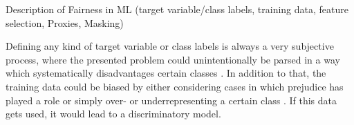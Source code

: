 Description of Fairness in ML (target variable/class labels, training data, feature selection, 
Proxies, Masking)

Defining any kind of target variable or class labels is always a very subjective process, where 
the presented problem could unintentionally be parsed in a way which systematically disadvantages 
certain classes \cite{Barocas.2016}. In addition to that, the training data could be biased by 
either considering cases in which prejudice has played a role or simply over- or underrepresenting 
a certain class \cite{Barocas.2016}. If this data gets used, it would lead to a discriminatory model. 
